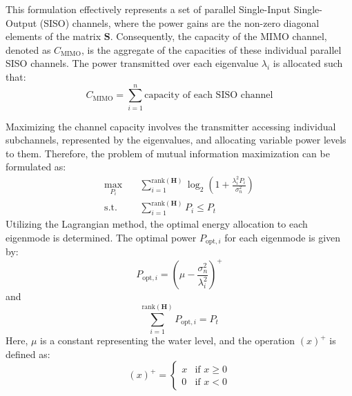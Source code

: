 \documentclass[lettersize,journal]{IEEEtran}
\begin{document}
This formulation effectively represents a set of parallel Single-Input Single-Output (SISO) channels, where the power gains are the non-zero diagonal elements of the matrix \( \mathbf{S} \). Consequently, the capacity of the MIMO channel, denoted as \( C_\text{MIMO} \), is the aggregate of the capacities of these individual parallel SISO channels. The power transmitted over each eigenvalue \( \lambda_i \) is allocated such that:
\begin{equation}
C_\text{MIMO} = \sum_{i=1}^{n} \text{capacity of each SISO channel}
\end{equation}

Maximizing the channel capacity involves the transmitter accessing individual subchannels, represented by the eigenvalues, and allocating variable power levels to them. Therefore, the problem of mutual information maximization can be formulated as:
\begin{equation} \label{eq:capacity}
\begin{aligned}
\max_{P_i} \quad & \sum_{i=1}^{\text{rank}(\mathbf{H})} \log_2 \left(1 + \frac{\lambda_i^2 P_i}{\sigma_n^2}\right) \\
\text{s.t.} \quad & \sum_{i=1}^{\text{rank}(\mathbf{H})} P_i \leq P_t
\end{aligned}
\end{equation}
Utilizing the Lagrangian method, the optimal energy allocation to each eigenmode is determined. The optimal power \( P_{\text{opt},i} \) for each eigenmode is given by:
\begin{equation} \label{eq:popt}
P_{\text{opt},i} = \left( \mu - \frac{\sigma_n^2}{\lambda_i^2} \right)^+
\end{equation}
and
\begin{equation} \label{eq:psum}
\sum_{i=1}^{\text{rank}(\mathbf{H})} P_{\text{opt},i} = P_{t}
\end{equation}
Here, \( \mu \) is a constant representing the water level, and the operation \( (x)^+ \) is defined as:
\begin{equation}
(x)^+ = 
\begin{cases} 
x & \text{if } x \geq 0 \\
0 & \text{if } x < 0
\end{cases}
\end{equation}
\end{document}
